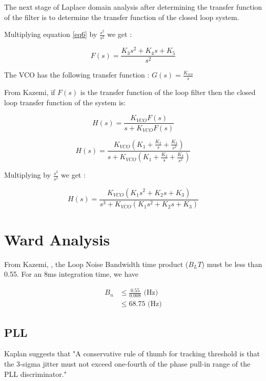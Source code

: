 The next stage of Laplace domain analysis after determining the transfer function of the filter is to determine the transfer function of the closed loop system.

Multiplying equation \ref{eq6} by $\frac{s^2}{s^2}$ we get :

\begin{equation}
F(s) = \frac{K_3s^2 + K_4 s + K_5}{s^2}
\end{equation}

The \ac{VCO} has the following transfer function : $G(s) = \frac{K_{vco}}{s}$

From Kazemi, if  $F(s)$ is the transfer function of the loop filter\cite{KazemiPHD} then the closed loop transfer function  of the system is: 

\begin{equation}
 H(s) = \frac{K_{VCO}F(s)}{s+K_{VCO}F(s)}
\end{equation}

\begin{equation}
 H(s) = \frac{K_{VCO}(K_1 + \frac{K_2}{s} + \frac{K_3}{s^2})}{s+K_{VCO}(K_1 + \frac{K_2}{s} + \frac{K_3}{s^2})}
\end{equation}

Multiplying by $\frac{s^2}{s^2}$ we get :

\begin{equation}
 H(s) = \frac{K_{VCO}(K_1s^2 + K_2s + K_3)}{s^3+K_{VCO}(K_1s^2 + K_2s + K_3)}
 \end{equation}

\section{Ward Analysis}

From Kazemi, \cite{Kazemi2008}, the Loop Noise Bandwidth time product ($B_L T$) must be less than 0.55. 
For an 8ms integration time, we have 

\begin{align*}
B_n &\leq \frac{0.55}{0.008} \text{ (Hz)}\\
    &\leq 68.75 \text{ (Hz)}
\end{align*}

\subsection{PLL}
Kaplan suggests that "A conservative rule of thumb for tracking threshold is that the 3-sigma jitter must not exceed one-fourth of the phase pull-in range of the PLL discriminator." %

